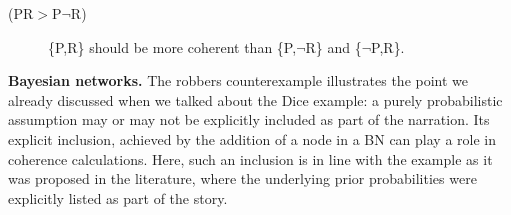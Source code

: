 \documentclass[
  10pt,
]{scrartcl}
\newcommand{\s}[1]{\textsf{#1}}
\begin{document}
\begin{description}
    \item[(\s{PR}$>$\s{P}$\neg$\s{R})] \{\s{P,R}\} should be more coherent than \{\s{P},$\neg$\s{R}\} and \{$\neg$\s{P},\s{R}\}.
\end{description}\vspace{2mm}

\textbf{Bayesian networks.} The robbers counterexample illustrates the point we already discussed when we talked about the Dice example: a purely probabilistic assumption may or may not be explicitly included as part of the narration. Its explicit inclusion, achieved by the addition of a node in a BN can play a role in coherence calculations. Here, such an inclusion is in line with the example as it was proposed in the literature, where the underlying prior probabilities were explicitly listed as part of the story.

\vspace{1mm}
\footnotesize

\normalsize
\end{document}
